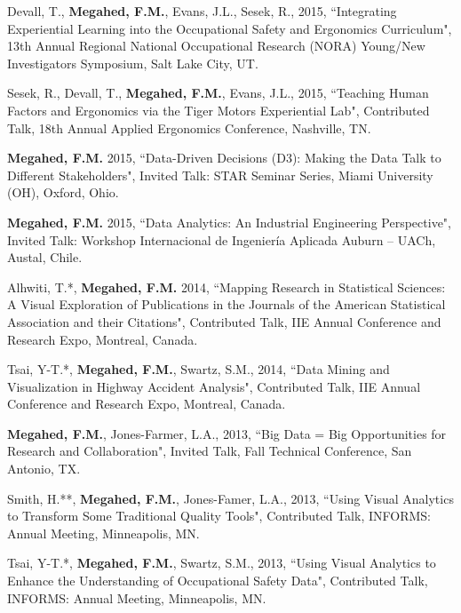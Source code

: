 \documentclass[margin,line]{res}
\begin{document}
\begin{resume}
\vspace{-1.5mm}
Devall, T., \textbf{Megahed, F.M.}, Evans, J.L., Sesek, R., 2015, ``Integrating Experiential Learning into the Occupational Safety and Ergonomics Curriculum",  13th Annual Regional National Occupational Research (NORA) Young/New Investigators Symposium, Salt Lake City, UT.

\vspace{-1.5mm}
Sesek, R., Devall, T., \textbf{Megahed, F.M.}, Evans, J.L., 2015, ``Teaching Human Factors and Ergonomics via the Tiger Motors Experiential Lab", Contributed Talk, 18th Annual Applied Ergonomics Conference, Nashville, TN.

\vspace{-1.5mm}
\textbf{Megahed, F.M.} 2015, ``Data-Driven Decisions (D3): Making the Data Talk to Different Stakeholders", Invited Talk: STAR Seminar Series, Miami University (OH), Oxford, Ohio.

\vspace{-1.5mm}
\textbf{Megahed, F.M.} 2015, ``Data Analytics: An Industrial Engineering Perspective", Invited Talk: Workshop Internacional de Ingeniería Aplicada Auburn – UACh, Austal, Chile.

\vspace{-1.5mm}
Alhwiti, T.*, \textbf{Megahed, F.M.} 2014, ``Mapping Research in Statistical Sciences: A Visual Exploration of Publications in the Journals of the American Statistical Association and their Citations", Contributed Talk, IIE Annual Conference and Research Expo, Montreal, Canada.

\vspace{-1.5mm}
Tsai, Y-T.*, \textbf{Megahed, F.M.}, Swartz, S.M., 2014, ``Data Mining and Visualization in Highway Accident Analysis", Contributed Talk, IIE Annual Conference and Research Expo, Montreal, Canada.

\vspace{-1.5mm}
\textbf{Megahed, F.M.}, Jones-Farmer, L.A., 2013, ``Big Data = Big Opportunities for Research and Collaboration", Invited Talk, Fall Technical Conference, San Antonio, TX.

\vspace{-1.5mm}
Smith, H.**, \textbf{Megahed, F.M.}, Jones-Famer, L.A., 2013, ``Using Visual Analytics to Transform Some Traditional Quality Tools", Contributed Talk, INFORMS: Annual Meeting, Minneapolis, MN.

\vspace{-1.5mm}
Tsai, Y-T.*, \textbf{Megahed, F.M.}, Swartz, S.M., 2013, ``Using Visual Analytics to Enhance the Understanding of Occupational Safety Data", Contributed Talk, INFORMS: Annual Meeting, Minneapolis, MN.


\end{resume}
\end{document}
